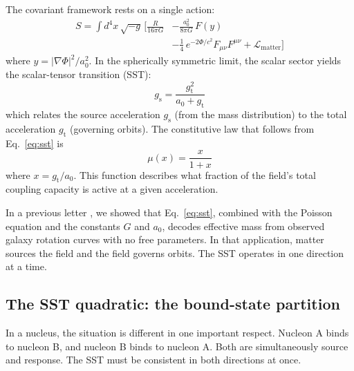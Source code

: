\documentclass[fleqn,usenatbib]{mnras}
\begin{document}
The covariant framework rests on a single action:
\begin{equation}
\begin{split}
S = \int d^4 x\,\sqrt{-g}\,\bigg[ \frac{R}{16\pi G} &- \frac{a_0^2}{8\pi G}\,F(y) \\
&- \frac{1}{4}\,e^{-2\Phi/c^2}F_{\mu\nu}F^{\mu\nu} + \mathcal{L}_{\mathrm{matter}} \bigg]
\end{split}
\label{eq:action}
\end{equation}
where $y = |\nabla\Phi|^2/a_0^2$. In the spherically symmetric limit, the scalar sector yields the scalar-tensor transition (SST):
\begin{equation}
g_{\mathrm{s}} = \frac{g_{\mathrm{t}}^2}{a_0 + g_{\mathrm{t}}}
\label{eq:sst}
\end{equation}
which relates the source acceleration $g_{\mathrm{s}}$ (from the mass distribution) to the total acceleration $g_{\mathrm{t}}$ (governing orbits). The constitutive law that follows from Eq.~\ref{eq:sst} is
\begin{equation}
\mu(x) = \frac{x}{1+x}
\label{eq:mu}
\end{equation}
where $x = g_{\mathrm{t}}/a_0$. This function describes what fraction of the field's total coupling capacity is active at a given acceleration.

In a previous letter \citep{Nelson2026}, we showed that Eq.~\ref{eq:sst}, combined with the Poisson equation and the constants $G$ and $a_0$, decodes effective mass from observed galaxy rotation curves with no free parameters. In that application, matter sources the field and the field governs orbits. The SST operates in one direction at a time.

\subsection{The SST quadratic: the bound-state partition}
\label{sec:quadratic}

In a nucleus, the situation is different in one important respect. Nucleon A binds to nucleon B, and nucleon B binds to nucleon A. Both are simultaneously source and response. The SST must be consistent in both directions at once.
\end{document}
